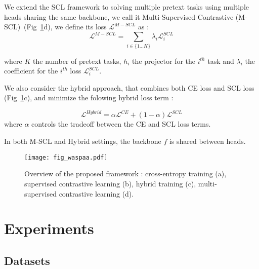 \documentclass{article}
\begin{document}
\begin{sloppy}
We extend the SCL framework to solving multiple pretext tasks using multiple heads sharing the same backbone, we call it Multi-Supervised Contrastive (M-SCL)~(Fig~\ref{fig:pip}d), we define its loss $\mathcal{L}^{M-SCL}$ as :
\begin{equation}
\label{mscl}
\mathcal{L}^{M-SCL} = \sum_{i\in \{1...K\}}\lambda_{i} \mathcal{L}_{i}^{SCL}
\end{equation}

where $K$ the number of pretext tasks, $h_{i}$ the projector for the $i^{th}$ task and $\lambda_{i}$ the coefficient for the $i^{th}$ loss $\mathcal{L}_{i}^{SCL}$.

We also consider the hybrid approach, that combines both CE loss and SCL loss (Fig~\ref{fig:pip}c), and minimize the folowing hybrid loss term :

\begin{equation}
\label{hybrid}
    \mathcal{L}^{Hybrid} = \alpha \mathcal{L}^{CE}  + (1 - \alpha) \mathcal{L}^{SCL}
\end{equation}
where $\alpha$ controls the tradeoff between the CE and SCL loss terms.

In both M-SCL and Hybrid settings, the backbone $f$ is shared between heads.

\begin{figure}[!t]
\begin{minipage}[b]{1.0\linewidth}
  \centering
  \centerline{\texttt{[image: fig\_waspaa.pdf]}}
\end{minipage}
\caption{Overview of the proposed framework : cross-entropy training (a), supervised contrastive learning (b), hybrid training (c), multi-supervised contrastive learning (d).}
\label{fig:pip}
\end{figure}

\section{Experiments}
\label{sec:exps}

\subsection{Datasets}
\label{ssec:dataset}


\end{sloppy}
\end{document}
